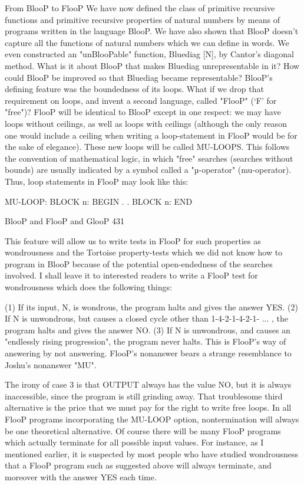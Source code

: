                                 From BlooP to FlooP
We have now defined the class of primitive recursive functions and primitive recursive
properties of natural numbers by means of programs written in the language BlooP. We
have also shown that BlooP doesn't capture all the functions of natural numbers which we
can define in words. We even constructed an "unBlooPable" function, Bluediag [N], by
Cantor's diagonal method. What is it about BlooP that makes Bluediag unrepresentable in
it? How could BlooP be improved so that Bluediag became representable?
        BlooP's defining feature was the boundedness of its loops. What if we drop that
requirement on loops, and invent a second language, called "FlooP" (`F' for "free")?
FlooP will be identical to BlooP except in one respect: we may have loops without
ceilings, as well as loops with ceilings (although the only reason one would include a
ceiling when writing a loop-statement in FlooP would be for the sake of elegance). These
new loops will be called MU-LOOPS. This follows the convention of mathematical
logic, in which "free" searches (searches without bounds) are usually indicated by a
symbol called a "µ-operator" (mu-operator). Thus, loop statements in FlooP may look
like this:

                             MU-LOOP:
                             BLOCK n: BEGIN
                                      .
                                      .
                             BLOCK n: END




BlooP and FlooP and GlooP                                                                431

   This feature will allow us to write tests in FlooP for such properties as wondrousness
and the Tortoise property-tests which we did not know how to program in BlooP because
of the potential open-endedness of the searches involved. I shall leave it to interested
readers to write a FlooP test for wondrousness which does the following things:

  (1) If its input, N, is wondrous, the program halts and gives the answer YES.
  (2) If N is unwondrous, but causes a closed cycle other than 1-4-2-1-4-2-1- ... , the
     program halts and gives the answer NO.
  (3) If N is unwondrous, and causes an "endlessly rising progression", the program
     never halts. This is FlooP's way of answering by not answering. FlooP's
     nonanswer bears a strange resemblance to Joshu's nonanswer "MU".

The irony of case 3 is that OUTPUT always has the value NO, but it is always
inaccessible, since the program is still grinding away. That troublesome third alternative
is the price that we must pay for the right to write free loops. In all FlooP programs
incorporating the MU-LOOP option, nontermination will always be one theoretical
alternative. Of course there will be many FlooP programs which actually terminate for all
possible input values. For instance, as I mentioned earlier, it is suspected by most people
who have studied wondrousness that a FlooP program such as suggested above will
always terminate, and moreover with the answer YES each time.

